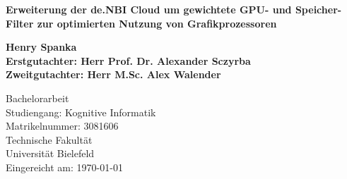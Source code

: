 
\begin{titlepage}
	
	
	\thispagestyle{frontpage}
	
	\begin{center}
		
		\vspace*{6\baselineskip}
		
		{\LARGE \textbf{Erweiterung der de.NBI Cloud um gewichtete GPU- und Speicher-Filter zur optimierten Nutzung von Grafikprozessoren\\}}
		
		
        \vspace*{1,5\baselineskip}

		\large{\textbf{Henry Spanka}}\\
		\large{\textbf{Erstgutachter: Herr Prof. Dr. Alexander Sczyrba}}\\
		\large{\textbf{Zweitgutachter: Herr M.Sc. Alex Walender}}\\
		
		\vspace{1,5\baselineskip}
		
		\large{Bachelorarbeit}\\
		\large{Studiengang: Kognitive Informatik}\\
		\large{Matrikelnummer: 3081606}\\
		
		\vspace{1,5\baselineskip}
		\large{Technische Fakultät}\\
		\large{Universität Bielefeld}\\

		\vspace{1,5\baselineskip}
		\large{Eingereicht am: \today}

	\end{center}
	
\end{titlepage}
